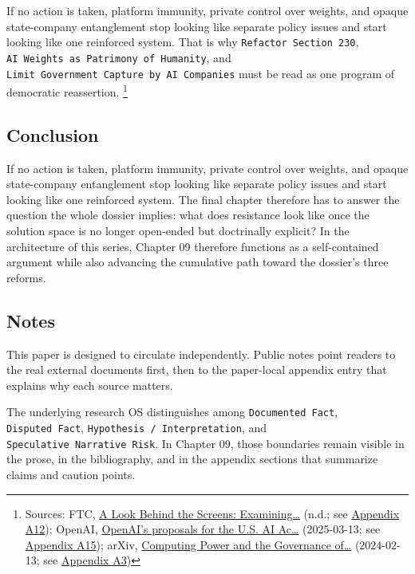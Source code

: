 \documentclass[
  american,
  11pt,
  letterpaper,
]{article}
\begin{document}
If no action is taken, platform immunity, private control over weights,
and opaque state-company entanglement stop looking like separate policy
issues and start looking like one reinforced system. That is why
\texttt{Refactor\ Section\ 230},
\texttt{AI\ Weights\ as\ Patrimony\ of\ Humanity}, and
\texttt{Limit\ Government\ Capture\ by\ AI\ Companies} must be read as
one program of democratic reassertion. \footnote{Sources: FTC,
  \href{https://www.ftc.gov/reports/look-behind-screens-examining-data-practices-social-media-video-streaming-services}{A
  Look Behind the Screens: Examining\ldots{}} (n.d.; see
  \hyperref[appendix-a12-a-look-behind-the-screens-examining-the-data-practices-of-social-media-and-video-streaming-services]{Appendix
  A12}); OpenAI,
  \href{https://openai.com/global-affairs/openai-proposals-for-the-us-ai-action-plan/}{OpenAI's
  proposals for the U.S. AI Ac\ldots{}} (2025-03-13; see
  \hyperref[appendix-a15-openais-proposals-for-the-us-ai-action-plan]{Appendix
  A15}); arXiv, \href{https://arxiv.org/abs/2402.08797}{Computing Power
  and the Governance of\ldots{}} (2024-02-13; see
  \hyperref[appendix-a3-computing-power-and-the-governance-of-artificial-intelligence]{Appendix
  A3})}

\subsection{Conclusion}\label{conclusion}

If no action is taken, platform immunity, private control over weights,
and opaque state-company entanglement stop looking like separate policy
issues and start looking like one reinforced system. The final chapter
therefore has to answer the question the whole dossier implies: what
does resistance look like once the solution space is no longer
open-ended but doctrinally explicit? In the architecture of this series,
Chapter 09 therefore functions as a self-contained argument while also
advancing the cumulative path toward the dossier's three reforms.

\subsection{Notes}\label{notes}

This paper is designed to circulate independently. Public notes point
readers to the real external documents first, then to the paper-local
appendix entry that explains why each source matters.

The underlying research OS distinguishes among
\texttt{Documented\ Fact}, \texttt{Disputed\ Fact},
\texttt{Hypothesis\ /\ Interpretation}, and
\texttt{Speculative\ Narrative\ Risk}. In Chapter 09, those boundaries
remain visible in the prose, in the bibliography, and in the appendix
sections that summarize claims and caution points.
\end{document}
